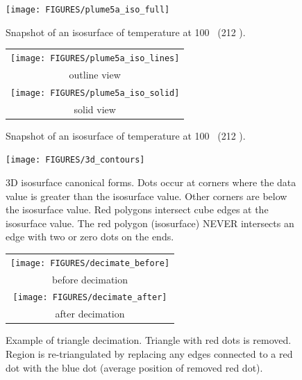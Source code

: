 \documentclass[11pt,twoside]{book}
\begin{document}
\begin{figure}[\figoptions]
\begin{center}
\texttt{[image: FIGURES/plume5a\_iso\_full]}\\
\end{center}
\caption{Snapshot of an isosurface of temperature at 100 \degC\ (212 \degF).
  }
\label{figisoa}%
\end{figure}

\begin{figure}[\figoptions]
\begin{center}
\begin{tabular}{c}
\texttt{[image: FIGURES/plume5a\_iso\_lines]}\\
outline view\\
\texttt{[image: FIGURES/plume5a\_iso\_solid]}\\
solid view
\end{tabular}
\end{center}
\caption{Snapshot of an isosurface of temperature at 100 \degC\ (212 \degF).
  }
\label{figisob}%
\end{figure}

\begin{figure}[\figoptions]
\begin{center}
\texttt{[image: FIGURES/3d\_contours]}
\end{center}
\caption[3D isosurface canonical forms.]{3D isosurface canonical
forms. Dots occur at corners where the data value is greater than
the isosurface value.  Other corners are below the isosurface
value.  Red polygons intersect cube edges at the isosurface value.
The red polygon (isosurface) NEVER intersects an edge with two or
zero dots on the ends.
  }
\label{figisosetup}%
\end{figure}


\begin{figure}[\figoptions]
\begin{center}
\begin{tabular}{c}
\texttt{[image: FIGURES/decimate\_before]}\\
before decimation\\
\texttt{[image: FIGURES/decimate\_after]}\\
after decimation
\end{tabular}
\end{center}
\caption[Example of triangle decimation.]{Example of triangle decimation.
Triangle with red dots is removed.  Region is re-triangulated by replacing
any edges connected to a red dot with the blue dot (average position of removed red dot).}
\label{figdecimate}%
\end{figure}
\end{document}
